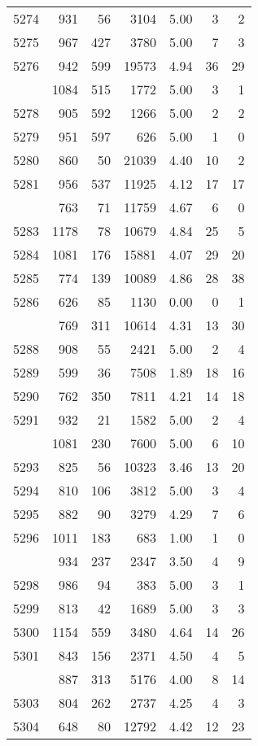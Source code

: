 \documentclass[
]{article}
\begin{document}
\begin{table}
\begin{tabular}[t]{lrrrrrr}
5274 & 931 & 56 & 3104 & 5.00 & 3 & 2\\
5275 & 967 & 427 & 3780 & 5.00 & 7 & 3\\
5276 & 942 & 599 & 19573 & 4.94 & 36 & 29\\
\addlinespace
5277 & 1084 & 515 & 1772 & 5.00 & 3 & 1\\
5278 & 905 & 592 & 1266 & 5.00 & 2 & 2\\
5279 & 951 & 597 & 626 & 5.00 & 1 & 0\\
5280 & 860 & 50 & 21039 & 4.40 & 10 & 2\\
5281 & 956 & 537 & 11925 & 4.12 & 17 & 17\\
\addlinespace
5282 & 763 & 71 & 11759 & 4.67 & 6 & 0\\
5283 & 1178 & 78 & 10679 & 4.84 & 25 & 5\\
5284 & 1081 & 176 & 15881 & 4.07 & 29 & 20\\
5285 & 774 & 139 & 10089 & 4.86 & 28 & 38\\
5286 & 626 & 85 & 1130 & 0.00 & 0 & 1\\
\addlinespace
5287 & 769 & 311 & 10614 & 4.31 & 13 & 30\\
5288 & 908 & 55 & 2421 & 5.00 & 2 & 4\\
5289 & 599 & 36 & 7508 & 1.89 & 18 & 16\\
5290 & 762 & 350 & 7811 & 4.21 & 14 & 18\\
5291 & 932 & 21 & 1582 & 5.00 & 2 & 4\\
\addlinespace
5292 & 1081 & 230 & 7600 & 5.00 & 6 & 10\\
5293 & 825 & 56 & 10323 & 3.46 & 13 & 20\\
5294 & 810 & 106 & 3812 & 5.00 & 3 & 4\\
5295 & 882 & 90 & 3279 & 4.29 & 7 & 6\\
5296 & 1011 & 183 & 683 & 1.00 & 1 & 0\\
\addlinespace
5297 & 934 & 237 & 2347 & 3.50 & 4 & 9\\
5298 & 986 & 94 & 383 & 5.00 & 3 & 1\\
5299 & 813 & 42 & 1689 & 5.00 & 3 & 3\\
5300 & 1154 & 559 & 3480 & 4.64 & 14 & 26\\
5301 & 843 & 156 & 2371 & 4.50 & 4 & 5\\
\addlinespace
5302 & 887 & 313 & 5176 & 4.00 & 8 & 14\\
5303 & 804 & 262 & 2737 & 4.25 & 4 & 3\\
5304 & 648 & 80 & 12792 & 4.42 & 12 & 23\\

\end{tabular}
\end{table}
\end{document}
